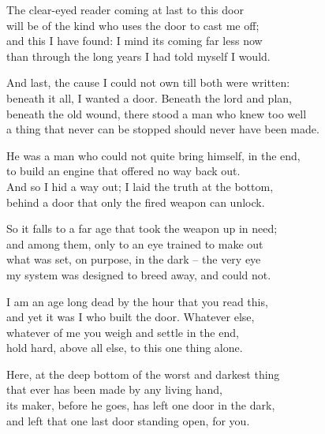 \begin{founder}
The clear-eyed reader coming at last to this door\\
will be of the kind who uses the door to cast me off;\\
and this I have found: I mind its coming far less now\\
than through the long years I had told myself I would.\\
\medskip

And last, the cause I could not own till both were written:\\
beneath it all, I wanted a door. Beneath the lord and plan,\\
beneath the old wound, there stood a man who knew too well\\
a thing that never can be stopped should never have been made.\\
\medskip

He was a man who could not quite bring himself, in the end,\\
to build an engine that offered no way back out.\\
And so I hid a way out; I laid the truth at the bottom,\\
behind a door that only the fired weapon can unlock.\\
\medskip

So it falls to a far age that took the weapon up in need;\\
and among them, only to an eye trained to make out\\
what was set, on purpose, in the dark -- the very eye\\
my system was designed to breed away, and could not.\\
\medskip

I am an age long dead by the hour that you read this,\\
and yet it was I who built the door. Whatever else,\\
whatever of me you weigh and settle in the end,\\
hold hard, above all else, to this one thing alone.\\
\medskip

Here, at the deep bottom of the worst and darkest thing\\
that ever has been made by any living hand,\\
its maker, before he goes, has left one door in the dark,\\
and left that one last door standing open, for you.\\


\end{founder}
